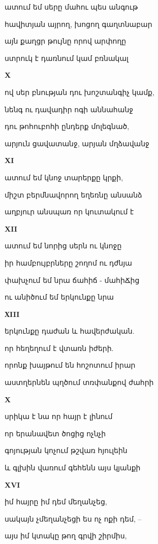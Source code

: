 ատում եմ սերը մահու պես անգութ


հավիտյան այրող, խոցող գաղտնաբար

այն քաղցր թույնը որով արփողը  


ստրուկ է դառնում  կամ բռնակալ 

\centerline {\bf  X}

ով սեր  բնության  դու խոշտանգիչ կամք,
 

նենգ ու դավադիր ոգի աննահանջ

դու թոհուբոհի ընդերք մոլեգնած,


 արյուն ցավատանջ, արյան մղձավանջ 


\centerline{\bf XI}

  ատում եմ կնոջ տարերքը կրքի,


միշտ բերմնավորող եղեռնը անսանձ


  աղբյուր   անսպառ որ կուտակում է



                           
\centerline{\bf XII}


ատում եմ  նորից սերն ու կնոջը



   իր համբույբրները շողոմ ու   դժնյա
 

փախչում եմ նրա ճահիճ - մահիՃից 


 ու անիծում եմ երկունքը նրա


\centerline{\bf ХIII}


երկունքը դաժան և հավերժական.
 
 
որ հեղեղում է վտառն իժերի.


որոնք խայթում են հոշոտում իրար


աստղերնեն պղծում տռփանքով ժահրի


             
\centerline {\bf  X  }



սրիկա է նա որ հայր է լինում 
  

որ երանավետ  ծոցից ոչնչի


գոյության կոչում թշվառ հյուլեին 

և  գլխին վառում գեհենն այս կյանքի



 \centerline {\bf   XVI} 

                  

 իմ հայրը իմ դեմ մեղանչեց,


  սակայն չմեղանչեցի ես ոչ ոքի  դեմ, -- 


  այս իմ կտակը թող գրվի շիրմիս,


